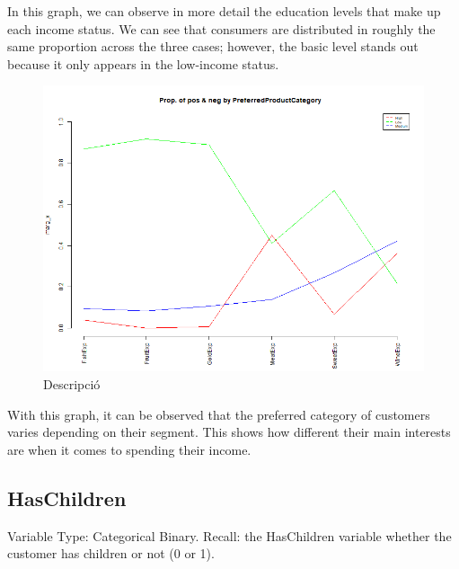 In this graph, we can observe in more detail the education levels that make up each income status. We can see that consumers are distributed in roughly the same proportion across the three cases; however, the basic level stands out because it only appears in the low-income status.


\begin{figure}[H]
    \centering
    \includegraphics[width= 1\linewidth]{Imatges/prop_cond_col_var_x_PreferredProductCategory_8_legend.png}
    \caption{Descripció}
    \label{fig:scree_plot_7} %
\end{figure}

With this graph, it can be observed that the preferred category of customers varies depending on their segment. This shows how different their main interests are when it comes to spending their income.

\newpage
\subsection{HasChildren}
Variable Type: Categorical Binary. 
Recall: the HasChildren variable whether the customer has children or not (0 or 1).

